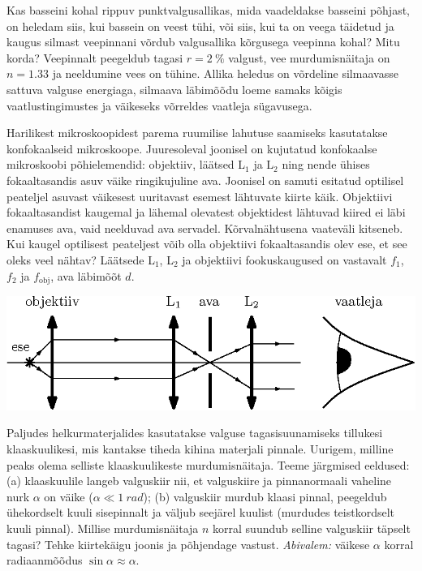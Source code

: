 \documentclass[10pt, twoside]{article}
\begin{document}
{%

Kas basseini kohal rippuv punktvalgusallikas, mida vaadeldakse basseini põhjast, on heledam siis, kui bassein on veest tühi, või siis, kui ta on veega täidetud ja kaugus silmast veepinnani võrdub valgusallika kõrgusega veepinna kohal? Mitu korda? Veepinnalt peegeldub tagasi $r = \SI{2}{\%}$ valgust, vee murdumisnäitaja on $n = \num{1,33}$ ja neeldumine vees on tühine. Allika heledus on võrdeline silmaavasse sattuva valguse energiaga, silmaava läbimõõdu loeme samaks kõigis vaatlustingimustes ja väikeseks võrreldes vaatleja sügavusega.
\probend
\bigskip


Harilikest mikroskoopidest parema ruumilise lahutuse saamiseks kasutatakse konfokaalseid
mikroskoope. Juuresoleval joonisel on kujutatud konfokaalse mikroskoobi põhielemendid:
objektiiv, läätsed L$_1$ ja L$_2$ ning nende ühises fokaaltasandis asuv väike ringikujuline ava.
Joonisel on samuti esitatud optilisel peateljel asuvast väikesest uuritavast esemest lähtuvate
kiirte käik.
Objektiivi fokaaltasandist kaugemal ja lähemal olevatest
objektidest lähtuvad kiired ei läbi enamuses ava, vaid neelduvad ava servadel.
Kõrvalnähtusena vaateväli kitseneb. Kui kaugel optilisest peateljest
võib olla objektiivi fokaaltasandis olev ese, et see oleks veel nähtav? Läätsede L$_1$, L$_2$ ja objektiivi fookuskaugused on vastavalt $f_1$, $f_2$ ja $f_{\mathrm{obj}}$, ava läbimõõt $d$.

\begin{center}
	\includegraphics[width=0.8\linewidth]{2009-v3g-07-G_konfokaalne_mikroskoop.eps}
\end{center}
\probend
\bigskip


Paljudes helkurmaterjalides kasutatakse valguse tagasisuunamiseks tillukesi
klaaskuulikesi, mis kantakse tiheda kihina materjali pinnale. Uurigem, milline
peaks olema selliste klaaskuulikeste murdumisnäitaja. Teeme järgmised eeldused:
(a) klaaskuulile langeb valguskiir nii, et valguskiire ja pinnanormaali vaheline
nurk $\alpha$ on väike ($\alpha \ll \SI{1}{rad}$); (b) valguskiir murdub klaasi
pinnal, peegeldub ühekordselt kuuli sisepinnalt ja väljub seejärel kuulist
(murdudes teistkordselt kuuli pinnal). Millise murdumisnäitaja $n$ korral
suundub selline valguskiir täpselt tagasi? Tehke kiirtekäigu joonis ja
põhjendage vastust. \emph{Abivalem:} väikese $\alpha$ korral radiaanmõõdus
$\sin\alpha \approx \alpha$.
\probend
\bigskip

}
\end{document}
